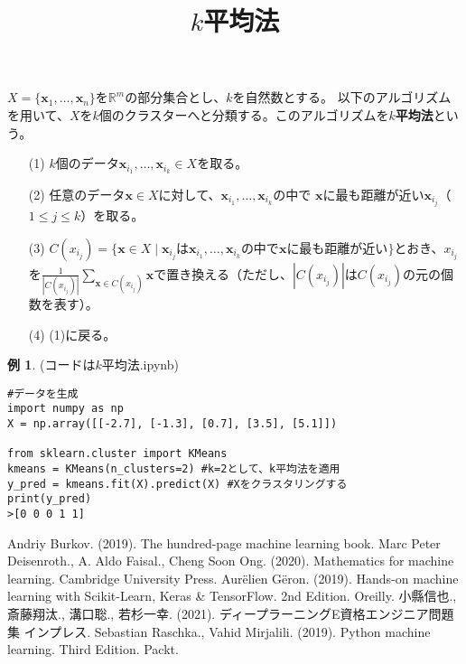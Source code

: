 \documentclass{jsarticle}
\theoremstyle{definition}
\newtheorem{ex}{例}[section]
\begin{document}
\title{$k$平均法}
\date{}
\maketitle
$X=\{\mathbf{x}_{1},\dots,\mathbf{x}_{n}\}$を$\mathbb{R}^{m}$の部分集合とし、$k$を自然数とする。
以下のアルゴリズムを用いて、$X$を$k$個のクラスターへと分類する。このアルゴリズムを\textbf{$k$平均法}という。
\begin{enumerate}
\item[(1)] $k$個のデータ$\mathbf{x}_{i_{1}},\dots,\mathbf{x}_{i_{k}}\in X$を取る。
\item[(2)] 任意のデータ$\mathbf{x}\in X$に対して、$\mathbf{x}_{i_{1}},\dots,\mathbf{x}_{i_{k}}$の中で
$\mathbf{x}$に最も距離が近い$\mathbf{x}_{i_{j}}$（$1\leq j\leq k$）を取る。
\item[(3)] $C(x_{i_{j}})=\{\mathbf{x}\in X\mid\text{$\mathbf{x}_{i_{j}}$は$\mathbf{x}_{i_{1}},\dots,\mathbf{x}_{i_{k}}$の中で$\mathbf{x}$に最も距離が近い}\}$とおき、$x_{i_{j}}$を$\frac{1}{|C(x_{i_{j}})|}\sum_{\mathbf{x}\in C(x_{i_{j}})}\mathbf{x}$で置き換える（ただし、$|C(x_{i_{j}})|$は$C(x_{i_{j}})$の元の個数を表す）。
\item[(4)] (1)に戻る。
\end{enumerate}
\begin{ex} (コードは$k$平均法.ipynb) 
\begin{verbatim}
#データを生成
import numpy as np
X = np.array([[-2.7], [-1.3], [0.7], [3.5], [5.1]])

from sklearn.cluster import KMeans
kmeans = KMeans(n_clusters=2) #k=2として、k平均法を適用
y_pred = kmeans.fit(X).predict(X) #Xをクラスタリングする
print(y_pred)
>[0 0 0 1 1]
\end{verbatim}
\end{ex}
\begin{thebibliography}{99}
 Andriy Burkov. (2019). The hundred-page machine learning book.
 Marc Peter Deisenroth., A. Aldo Faisal., Cheng Soon Ong. (2020). Mathematics for machine learning. Cambridge University Press.
 Aur\"{e}lien G\"{e}ron. (2019). Hands-on machine learning with Scikit-Learn, Keras \&  TensorFlow. 2nd Edition. Oreilly.
 小縣信也., 斎藤翔汰., 溝口聡., 若杉一幸. (2021). ディープラーニングE資格エンジニア問題集 インプレス.
 Sebastian Raschka., Vahid Mirjalili. (2019). Python machine learning. Third Edition. Packt.

\end{thebibliography}
\end{document}
